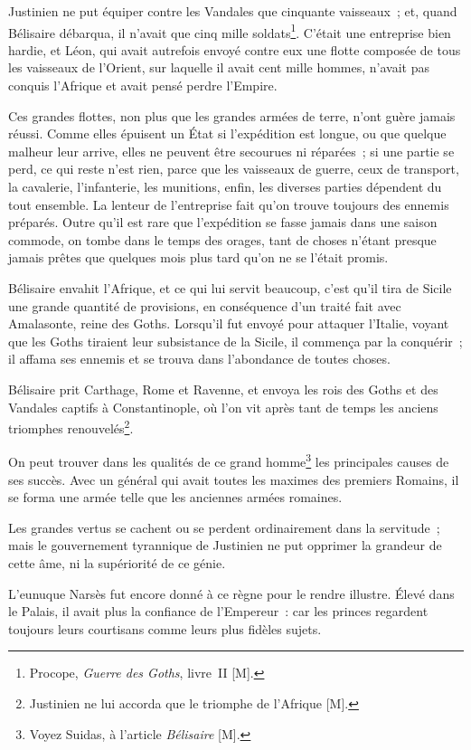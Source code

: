 \documentclass[french,twoside]{book} %
\begin{document}
Justinien ne put équiper contre les Vandales que cinquante vaisseaux ; et, quand Bélisaire débarqua, il n’avait que cinq mille soldats\footnote{Procope, {\itshape Guerre des Goths}, livre II [M].}. C’était une entreprise bien hardie, et Léon, qui avait autrefois envoyé contre eux une flotte composée de tous les vaisseaux de l’Orient, sur laquelle il avait cent mille hommes, n’avait pas conquis l’Afrique et avait pensé perdre l’Empire.\par
Ces grandes flottes, non plus que les grandes armées de terre, n’ont guère jamais réussi. Comme elles épuisent un État si l’expédition est longue, ou que quelque malheur leur arrive, elles ne peuvent être secourues ni réparées ; si une partie se perd, ce qui reste n’est rien, parce que les vaisseaux de guerre, ceux de transport, la cavalerie, l’infanterie, les munitions, enfin, les diverses parties dépendent du tout ensemble. La lenteur de l’entreprise fait qu’on trouve toujours des ennemis préparés. Outre qu’il est rare que l’expédition se fasse jamais dans une saison commode, on tombe dans le temps des orages, tant de choses n’étant presque jamais prêtes que quelques mois plus tard qu’on ne se l’était promis.\par
Bélisaire envahit l’Afrique, et ce qui lui servit beaucoup, c’est qu’il tira de Sicile une grande quantité de provisions, en conséquence d’un traité fait avec Amalasonte, reine des Goths. Lorsqu’il fut envoyé pour attaquer l’Italie, voyant que les Goths tiraient leur subsistance de la Sicile, il commença par la conquérir ; il affama ses ennemis et se trouva dans l’abondance de toutes choses.\par
Bélisaire prit Carthage, Rome et Ravenne, et envoya les rois des Goths et des Vandales captifs à Constantinople, où l’on vit après tant de temps les anciens triomphes renouvelés\footnote{Justinien ne lui accorda que le triomphe de l’Afrique [M].}.\par
On peut trouver dans les qualités de ce grand homme\footnote{Voyez Suidas, à l’article {\itshape Bélisaire} [M].} les principales causes de ses succès. Avec un général qui avait toutes les maximes des premiers Romains, il se forma une armée telle que les anciennes armées romaines.\par
Les grandes vertus se cachent ou se perdent ordinairement dans la servitude ; mais le gouvernement tyrannique de Justinien ne put opprimer la grandeur de cette âme, ni la supériorité de ce génie.\par
L’eunuque Narsès fut encore donné à ce règne pour le rendre illustre. Élevé dans le Palais, il avait plus la confiance de l’Empereur : car les princes regardent toujours leurs courtisans comme leurs plus fidèles sujets.\par
\end{document}
